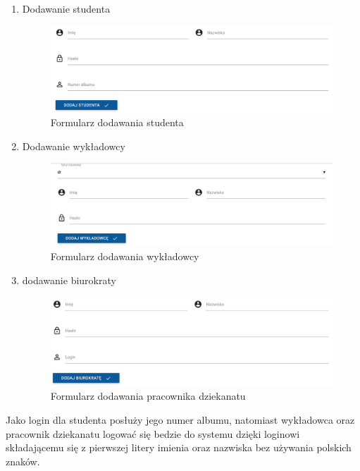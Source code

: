 \documentclass{xmgr}
\begin{document}
\begin{enumerate}

\item Dodawanie studenta

\begin{figure}[H]
\centering
\includegraphics[width=1.1\hsize]{images/addNewStudent}
\caption{Formularz dodawania studenta\label{RYS.7}}
\end{figure}

\newpage
\item Dodawanie wykładowcy

\begin{figure}[th!]
\centering
\includegraphics[width=0.9\hsize]{images/addTeacher}
\caption{Formularz dodawania wykładowcy\label{RYS.8}}
\end{figure}

\item dodawanie biurokraty

\begin{figure}[th!]
\centering
\includegraphics[width=0.7\hsize]{images/addBiurokrata}
\caption{Formularz dodawania pracownika dziekanatu\label{RYS.9}}
\end{figure}

\end{enumerate}

\noindent Jako login dla studenta posłuży jego numer albumu, natomiast wykładowca oraz pracownik dziekanatu logować się bedzie do systemu  dzięki loginowi składającemu się z pierwszej litery imienia oraz nazwiska bez używania polskich znaków.
\end{document}
